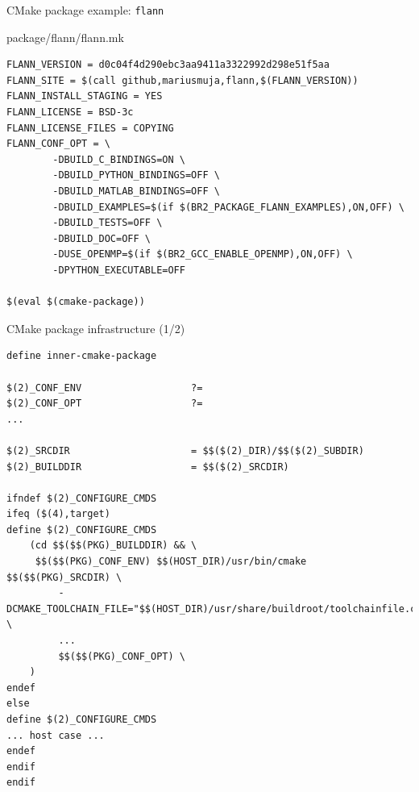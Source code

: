 \begin{frame}[fragile]{CMake package example: {\tt flann}}

\begin{block}{package/flann/flann.mk}
\begin{verbatim}
FLANN_VERSION = d0c04f4d290ebc3aa9411a3322992d298e51f5aa
FLANN_SITE = $(call github,mariusmuja,flann,$(FLANN_VERSION))
FLANN_INSTALL_STAGING = YES
FLANN_LICENSE = BSD-3c
FLANN_LICENSE_FILES = COPYING
FLANN_CONF_OPT = \
        -DBUILD_C_BINDINGS=ON \
        -DBUILD_PYTHON_BINDINGS=OFF \
        -DBUILD_MATLAB_BINDINGS=OFF \
        -DBUILD_EXAMPLES=$(if $(BR2_PACKAGE_FLANN_EXAMPLES),ON,OFF) \
        -DBUILD_TESTS=OFF \
        -DBUILD_DOC=OFF \
        -DUSE_OPENMP=$(if $(BR2_GCC_ENABLE_OPENMP),ON,OFF) \
        -DPYTHON_EXECUTABLE=OFF

$(eval $(cmake-package))
\end{verbatim}
\end{block}

\end{frame}

\begin{frame}[fragile]{CMake package infrastructure (1/2)}

\begin{block}{}
\begin{verbatim}
define inner-cmake-package

$(2)_CONF_ENV                   ?=
$(2)_CONF_OPT                   ?=
...

$(2)_SRCDIR                     = $$($(2)_DIR)/$$($(2)_SUBDIR)
$(2)_BUILDDIR                   = $$($(2)_SRCDIR)

ifndef $(2)_CONFIGURE_CMDS
ifeq ($(4),target)
define $(2)_CONFIGURE_CMDS
    (cd $$($$(PKG)_BUILDDIR) && \
     $$($$(PKG)_CONF_ENV) $$(HOST_DIR)/usr/bin/cmake $$($$(PKG)_SRCDIR) \
         -DCMAKE_TOOLCHAIN_FILE="$$(HOST_DIR)/usr/share/buildroot/toolchainfile.cmake" \
         ...
         $$($$(PKG)_CONF_OPT) \
    )
endef
else
define $(2)_CONFIGURE_CMDS
... host case ...
endef
endif
endif
\end{verbatim}
\end{block}

\end{frame}

